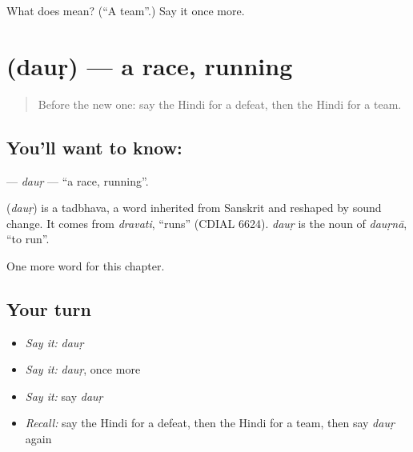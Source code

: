 \begin{tcolorbox}[breakable,colback=teal!4,colframe=teal!35!black,title={Before you move on}]
What does  mean? (\textquotedblleft{}A team\textquotedblright{}.) Say it once more.
\end{tcolorbox}
\section[\texorpdfstring{\hi{दौड़} (dauṛ)}{दौड़ (dauṛ)}]{ (dauṛ) — a race, running}

\label{lesson:HI-C224-daur}



\begin{quote}
Before the new one: say the Hindi for a defeat, then the Hindi for a team.
\end{quote}

\subsection*{You'll want to know: }
\textbf{} — \emph{dauṛ} — \textquotedblleft{}a race, running\textquotedblright{}.

\begin{cousinweb}
\textbf{} (\emph{dauṛ}) is a tadbhava, a word inherited from Sanskrit and reshaped by sound change. It comes from \emph{dravati}, \textquotedblleft{}runs\textquotedblright{} (CDIAL 6624). \emph{dauṛ} is the noun of \emph{dauṛnā}, \textquotedblleft{}to run\textquotedblright{}.
\end{cousinweb}

\begin{grammarlens}[title={What you've built}]
One more word for this chapter.
\end{grammarlens}

\subsection*{Your turn}
\begin{itemize}
\raggedright
  \item \emph{Say it:} \emph{dauṛ}
  \item \emph{Say it:} \emph{dauṛ}, once more
  \item \emph{Say it:} say \emph{dauṛ}
  \item \emph{Recall:} say the Hindi for a defeat, then the Hindi for a team, then say \emph{dauṛ} again
\end{itemize}

